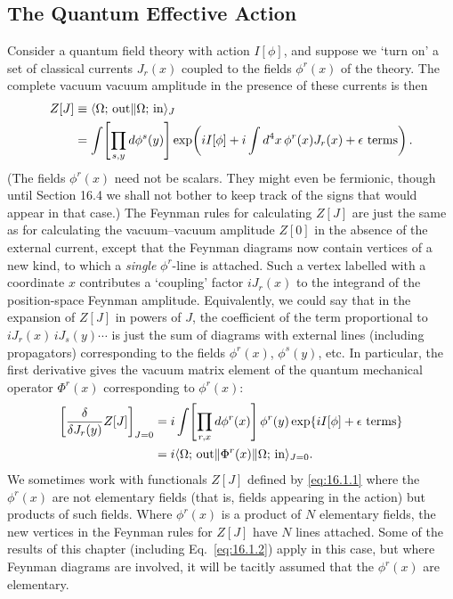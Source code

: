 \subsection{The Quantum Effective Action}
\label{sec:16.1}

Consider a quantum field theory with action $I[\phi]$, and suppose we `turn
on' a set of classical currents $J_r(x)$ coupled to the fields $\phi^r(x)$ of the
theory. The complete vacuum vacuum amplitude in the presence of these
currents is then
\begin{align}
Z[J]
&\equiv \langle \Omega;\,\mathrm{out}\|\Omega;\,\mathrm{in}\rangle_J \notag\\
&=\int\!\left[\prod_{s,y}d\phi^s(y)\right]
 \exp\!\left(iI[\phi]+i\int d^4x\,\phi^r(x)J_r(x)+\epsilon\text{ terms}\right).
\label{eq:16.1.1}
\end{align}
(The fields $\phi^r(x)$ need not be scalars. They might even be fermionic,
though until Section 16.4 we shall not bother to keep track of the signs
that would appear in that case.) The Feynman rules for calculating $Z[J]$
are just the same as for calculating the vacuum--vacuum amplitude $Z[0]$ in
the absence of the external current, except that the Feynman diagrams now
contain vertices of a new kind, to which a \emph{single} $\phi^r$-line is attached. Such
a vertex labelled with a coordinate $x$ contributes a `coupling' factor $iJ_r(x)$
to the integrand of the position-space Feynman amplitude. Equivalently,
we could say that in the expansion of $Z[J]$ in powers of $J$, the coefficient
of the term proportional to $iJ_r(x)\,iJ_s(y)\cdots$ is just the sum of diagrams
with external lines (including propagators) corresponding to the fields
$\phi^r(x)$, $\phi^s(y)$, etc. In particular, the first derivative gives the vacuum
matrix element of the quantum mechanical operator $\Phi^r(x)$ corresponding
to $\phi^r(x)$:
\begin{align}
\left[\frac{\delta}{\delta J_r(y)}Z[J]\right]_{J=0}
&=i\int\!\left[\prod_{r,x}d\phi^r(x)\right]
 \phi^r(y)\exp\{iI[\phi]+\epsilon\text{ terms}\} \notag\\
&=i\langle \Omega;\,\mathrm{out}\|\Phi^r(x)\|\Omega;\,\mathrm{in}\rangle_{J=0}.
\label{eq:16.1.2}
\end{align}
We sometimes work with functionals $Z[J]$ defined by \eqref{eq:16.1.1} where the
$\phi^r(x)$ are not elementary fields (that is, fields appearing in the action) but
products of such fields. Where $\phi^r(x)$ is a product of $N$ elementary fields,
the new vertices in the Feynman rules for $Z[J]$ have $N$ lines attached.
Some of the results of this chapter (including Eq.\ \eqref{eq:16.1.2}) apply in this
case, but where Feynman diagrams are involved, it will be tacitly assumed
that the $\phi^r(x)$ are elementary.

